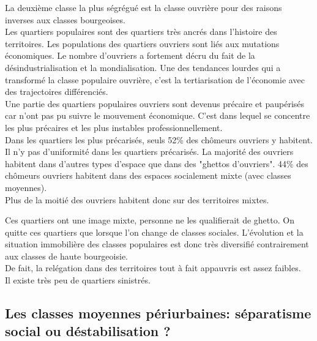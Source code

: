 \documentclass[12pt, a4paper, openany]{book}
\begin{document}
La deuxième classe la plus ségrégué est la classe ouvrière pour des raisons inverses aux classes bourgeoises. \\
Les quartiers populaires sont des quartiers très ancrés dans l'histoire des territoires. Les populations des quartiers ouvriers sont liés aux mutations économiques. Le nombre d'ouvriers a fortement décru du fait de la désindustrialisation et la mondialisation. Une des tendances lourdes qui a transformé la classe populaire ouvrière, c'est la tertiarisation de l'économie avec des trajectoires différenciés. \\
Une partie des quartiers populaires ouvriers sont devenus précaire et paupérisés car n'ont pas pu suivre le mouvement économique. C'est dans lequel se concentre les plus précaires et les plus instables professionnellement. \\
Dans les quartiers les plus précarisés, seuls 52\% des chômeurs ouvriers y habitent. Il n'y pas d'uniformité dans les quartiers précarisés. La majorité des ouvriers habitent dans d'autres types d'espace que dans des "ghettos d'ouvriers". 44\% des chômeurs ouvriers habitent dans des espaces socialement mixte (avec classes moyennes). \\
Plus de la moitié des ouvriers habitent donc sur des territoires mixtes.


Ces quartiers ont une image mixte, personne ne les qualifierait de ghetto. On quitte ces quartiers que lorsque l'on change de classes sociales. L'évolution et la situation immobilière des classes populaires est donc très diversifié contrairement aux classes de haute bourgeoisie. \\
De fait, la relégation dans des territoires tout à fait appauvris est assez faibles. \\
Il existe très peu de quartiers sinistrés.

\subsection{Les classes moyennes périurbaines: séparatisme social ou déstabilisation ?}
\end{document}
